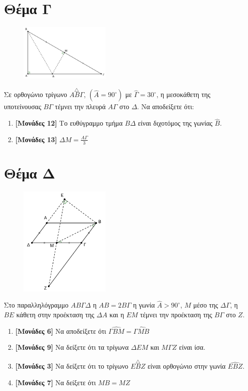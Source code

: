 \documentclass[12pt]{article}
\begin{document}
\section*{Θέμα Γ}
  \noindent
  \begin{figure}
    \centering
    \vspace{-50pt}
    \includegraphics[width=0.4\textwidth]{2017AGeo3}
  \end{figure}
  Σε ορθογώνιο τρίγωνο $\overset{\triangle}{ΑΒΓ}$, $\left( \hat{Α}=  90^{\circ} \right)$ με $\hat{Γ}=30^{\circ}$, η μεσοκάθετη της υποτείνουσας $ΒΓ$ τέμνει την πλευρά $ΑΓ$ στο $Δ$. Να αποδείξετε ότι:
  \begin{enumerate}
    \item \textbf{[Μονάδες 12]} Το ευθύγραμμο τμήμα $ΒΔ$ είναι διχοτόμος της γωνίας $\hat{Β}$.
    \item \textbf{[Μονάδες 13]} $ΔΜ=\frac{ΑΓ}{3}$
  \end{enumerate}

\section*{Θέμα Δ}
  \noindent
  \begin{figure}
    \centering
    \vspace{-50pt}
    \includegraphics[width=0.4\textwidth]{2017AGeo4}
  \end{figure}
  Στο παραλληλόγραμμο $ΑΒΓΔ$ η $ΑΒ=2ΒΓ$ η γωνία $\hat{Α}>90^{\circ}$, $Μ$ μέσο της $ΔΓ$, η $ΒΕ$ κάθετη στην προέκταση της $ΔΑ$ και η $ΕΜ$ τέμνει την προέκταση της $ΒΓ$ στο $Ζ$.
  \begin{enumerate}
    \item \textbf{[Μονάδες 6]}  Να αποδείξετε ότι $\widehat{ΓΒΜ}=\widehat{ΓΜΒ}$
    \item \textbf{[Μονάδες 9]}  Να δείξετε ότι τα τρίγωνα $ΔΕΜ$ και $ΜΓΖ$ είναι ίσα.
    \item \textbf{[Μονάδες 3]}  Να δείξετε ότι το τρίγωνο $\overset{\triangle}{ΕΒΖ}$ είναι ορθογώνιο στην γωνία $\widehat{ΕΒΖ}$.
    \item \textbf{[Μονάδες 7]}  Να δείξετε ότι $ΜΒ=ΜΖ$
  \end{enumerate}
\end{document}
